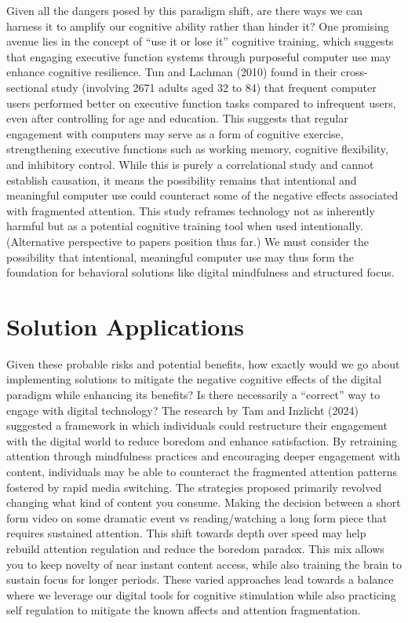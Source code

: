 \documentclass[12pt,letterpaper]{article}
\begin{document}
Given all the dangers posed by this paradigm shift, are there ways we can harness it to amplify our cognitive ability rather than hinder it? One promising avenue lies in the concept of ``use it or lose it'' cognitive training, which suggests that engaging executive function systems through purposeful computer use may enhance cognitive resilience. Tun and Lachman (2010) found in their cross-sectional study (involving 2671 adults aged 32 to 84) that frequent computer users performed better on executive function tasks compared to infrequent users, even after controlling for age and education. This suggests that regular engagement with computers may serve as a form of cognitive exercise, strengthening executive functions such as working memory, cognitive flexibility, and inhibitory control. While this is purely a correlational study and cannot establish causation, it means the possibility remains that intentional and meaningful computer use could counteract some of the negative effects associated with fragmented attention. This study reframes technology not as inherently harmful but as a potential cognitive training tool when used intentionally. (Alternative perspective to papers position thus far.) We must consider the possibility that intentional, meaningful computer use may thus form the foundation for behavioral solutions like digital mindfulness and structured focus.

\section*{Solution Applications}

Given these probable risks and potential benefits, how exactly would we go about implementing solutions to mitigate the negative cognitive effects of the digital paradigm while enhancing its benefits? Is there necessarily a ``correct'' way to engage with digital technology? The research by Tam and Inzlicht (2024) suggested a framework in which individuals could restructure their engagement with the digital world to reduce boredom and enhance satisfaction. By retraining attention through mindfulness practices and encouraging deeper engagement with content, individuals may be able to counteract the fragmented attention patterns fostered by rapid media switching. The strategies proposed primarily revolved changing what kind of content you consume. Making the decision between a short form video on some dramatic event vs reading/watching a long form piece that requires sustained attention. This shift towards depth over speed may help rebuild attention regulation and reduce the boredom paradox. This mix allows you to keep novelty of near instant content access, while also training the brain to sustain focus for longer periods. These varied approaches lead towards a balance where we leverage our digital tools for cognitive stimulation while also practicing self regulation to mitigate the known affects and attention fragmentation.
\end{document}
